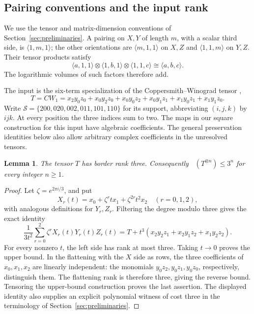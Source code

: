 \documentclass[11pt]{article}
\numberwithin{equation}{section}
\newtheorem{lemma}[theorem]{Lemma}
\theoremstyle{definition}
\theoremstyle{remark}
\DeclareMathOperator{\brank}{\underline R}
\begin{document}
\subsection{Pairing conventions and the input rank}
\label{alg:conventions}

We use the tensor and matrix-dimension conventions of
Section~\ref{sec:preliminaries}.
A pairing on \(X,Y\) of length \(m\), with a scalar third side, is
\(\langle1,m,1\rangle\); the other orientations are
\(\langle m,1,1\rangle\) on \(X,Z\) and
\(\langle1,1,m\rangle\) on \(Y,Z\).
Their tensor products satisfy
\begin{equation}
 \langle a,1,1\rangle\otimes\langle1,b,1\rangle
 \otimes\langle1,1,c\rangle\cong\langle a,b,c\rangle.
 \label{alg:pairing-product}
\end{equation}
The logarithmic volumes of such factors therefore add.

The input is the six-term specialization of the Coppersmith--Winograd
tensor \citep[Section~7, equation~(10)]{cw},
\begin{equation}
 T=CW_1=x_2y_0z_0+x_0y_2z_0+x_0y_0z_2
        +x_0y_1z_1+x_1y_0z_1+x_1y_1z_0.
 \label{alg:cw}
\end{equation}
Write
\(\mathcal S=\{200,020,002,011,101,110\}\) for its support, abbreviating
\((i,j,k)\) by \(ijk\).  At every position the three indices sum to two.
The maps in our square construction for this input have algebraic
coefficients.  The general preservation identities below also allow
arbitrary complex coefficients in the unresolved tensors.

\begin{lemma}
\label{alg:cw-rank}
The tensor \(T\) has border rank three.  Consequently
\(\brank(T^{\otimes n})\leq3^n\) for every integer \(n\geq1\).
\end{lemma}
\begin{proof}
Let \(\zeta=e^{2\pi i/3}\), and put
\[
 X_r(t)=x_0+\zeta^r t x_1+\zeta^{2r}t^2x_2
 \quad (r=0,1,2),
\]
with analogous definitions for \(Y_r,Z_r\).  Filtering the degree modulo
three gives the exact identity
\[
 \frac{1}{3t^2}\sum_{r=0}^2\zeta^r X_r(t)Y_r(t)Z_r(t)
 =T+t^3(x_2y_2z_1+x_2y_1z_2+x_1y_2z_2).
\]
For every nonzero \(t\), the left side has rank at most three.  Taking
\(t\to0\) proves the upper bound.  In the flattening with the \(X\) side
as rows, the three coefficients of \(x_0,x_1,x_2\) are linearly independent:
the monomials \(y_0z_2,y_0z_1,y_0z_0\), respectively, distinguish them.
The flattening rank is therefore three, giving the reverse bound.  Tensoring
the upper-bound construction proves the last assertion.
The displayed identity also supplies an explicit polynomial witness of
cost three in the terminology of Section~\ref{sec:preliminaries}.
\end{proof}
\end{document}
